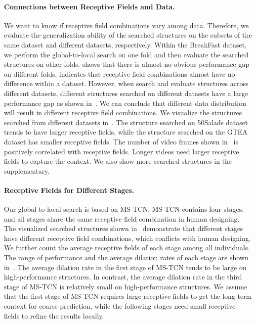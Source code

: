 \documentclass[final]{cvpr}
\newcommand{\myPara}[1]{\vspace{-.12in}\paragraph{#1}}
\begin{document}
\myPara{Connections between Receptive Fields and Data.}
We want to know if receptive field combinations vary among data.
Therefore, we evaluate the generalization ability of the searched structures 
on the subsets of the same dataset and different datasets, respectively.
Within the BreakFast dataset, we perform the global-to-local search on one fold and then
 evaluate the searched structures on other folds.
 shows that there is almost no obvious performance gap on different folds, 
indicates that receptive field combinations almost have no difference within a dataset.
However, when search and evaluate structures across different datasets,  
different structures searched on different datasets have a large performance gap as shown in~. 
We can conclude that different data distribution will result in different receptive field combinations.
We visualize the structures searched from different datasets in~.
The structure searched on 50Salads dataset trends to have larger receptive fields, while the structure searched on the GTEA dataset
has smaller receptive fields. 
The number of video frames shown in~ is positively correlated with receptive fields. 
Longer videos need larger receptive fields to capture the context.
We also show more searched structures in the supplementary.

\myPara{Receptive Fields for Different Stages.}
Our global-to-local search is based on MS-TCN.
MS-TCN contains four stages, and all stages share the same receptive field combination in human designing.
The visualized searched structures shown in~ demonstrate that 
different stages have different receptive field combinations,
which conflicts with human designing. 
We further count the average receptive fields of each stage among all individuals. The range of performance and the average dilation rates of each stage are shown in~.
The average dilation rate in the first stage of MS-TCN tends to be large on high-performance structures. 
In contrast, the average dilation rate in the third stage of MS-TCN is relatively small on high-performance structures.
We assume that the first stage of MS-TCN requires large receptive fields to 
get the long-term context for coarse prediction, while the following stages need small receptive fields to refine the results locally. 
\end{document}
